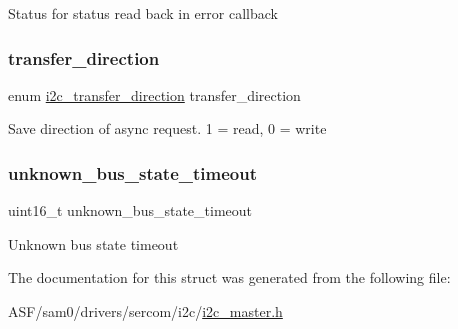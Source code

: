 Status for status read back in error callback \mbox{\label{structi2c__master__module_a0629187cb02ff04ad38fde4d546be4d1}} 
\subsubsection{\texorpdfstring{transfer\_direction}{transfer\_direction}}
{\footnotesize\ttfamily enum \mbox{\hyperlink{i2c__common_8h_ad7ea327439ceaf6931b91865d12449fc}{i2c\+\_\+transfer\+\_\+direction}} transfer\+\_\+direction}

Save direction of async request. 1 = read, 0 = write \mbox{\label{structi2c__master__module_ae1dc34ce71ac470c5f24c79bcd8d48e5}} 
\subsubsection{\texorpdfstring{unknown\_bus\_state\_timeout}{unknown\_bus\_state\_timeout}}
{\footnotesize\ttfamily uint16\+\_\+t unknown\+\_\+bus\+\_\+state\+\_\+timeout}

Unknown bus state timeout 

The documentation for this struct was generated from the following file\+:\begin{DoxyCompactItemize}
\item 
A\+S\+F/sam0/drivers/sercom/i2c/\mbox{\hyperlink{i2c__master_8h}{i2c\+\_\+master.\+h}}\end{DoxyCompactItemize}
